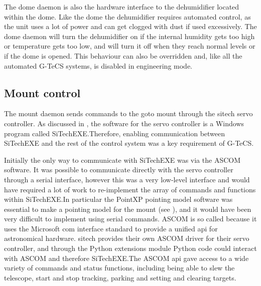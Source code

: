 \begin{colsection}
\begin{colsection}
The dome daemon is also the hardware interface to the dehumidifier located within the dome. Like the dome the dehumidifier requires automated control, as the unit uses a lot of power and can get clogged with dust if used excessively. The dome daemon will turn the dehumidifier on if the internal humidity gets too high or temperature gets too low, and will turn it off when they reach normal levels or if the dome is opened. This behaviour can also be overridden and, like all the automated G-TeCS systems, is disabled in engineering mode.

\end{colsection}


\subsection{Mount control}
\label{sec:mount}
\begin{colsection}

The mount daemon sends commands to the \gls{goto} mount through the \gls{sitech} servo controller. As discussed in , the software for the servo controller is a Windows program called SiTechEXE.\@ Therefore, enabling communication between SiTechEXE and the rest of the control system was a key requirement of G-TeCS.\@

Initially the only way to communicate with SiTechEXE was via the ASCOM software. It was possible to communicate directly with the servo controller through a serial interface, however this was a very low-level interface and would have required a lot of work to re-implement the array of commands and functions within SiTechEXE.\@ In particular the PointXP pointing model software was essential to make a pointing model for the mount (see ), and it would have been very difficult to implement using serial commands. ASCOM is so called because it uses the Microsoft \gls{com} interface standard to provide a unified \gls{api} for astronomical hardware. \gls{sitech} provides their own ASCOM driver for their servo controller, and through the Python  extensions module Python code could interact with ASCOM and therefore SiTechEXE.\@ The ASCOM \gls{api} gave access to a wide variety of commands and status functions, including being able to slew the telescope, start and stop tracking, parking and setting and clearing targets.


\end{colsection}
\end{colsection}
